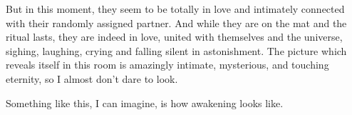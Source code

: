 But in this moment, they seem to be totally in love and intimately connected with their randomly assigned partner. And while they are on the mat and the ritual lasts, they are indeed in love, united with themselves and the universe, sighing, laughing, crying and falling silent in astonishment.
The picture which reveals itself in this room is amazingly intimate, mysterious, and touching eternity, so I almost don't dare to look.

Something like this, I can imagine, is how awakening looks like.

